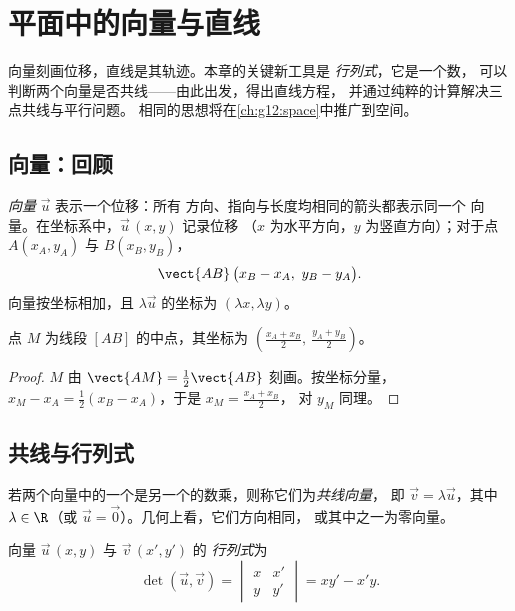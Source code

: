 \chapter{平面中的向量与直线}\label{ch:g11:vect}

向量刻画位移，直线是其轨迹。本章的关键新工具是
\emph{行列式}，它是一个数，
可以判断两个向量是否共线——由此出发，得出直线方程，
并通过纯粹的计算解决三点共线与平行问题。
相同的思想将在\cref{ch:g12:space}中推广到空间。

\section{向量：回顾}

\begin{definition}[向量，坐标]\label{def:g11:vect:vector}
\emph{向量} $\vec u$ 表示一个位移：所有
方向、指向与长度均相同的箭头都表示同一个
向量。在坐标系中，$\vec u\,(x, y)$ 记录位移
（$x$ 为水平方向，$y$ 为竖直方向）；对于点 $A(x_A, y_A)$ 与
$B(x_B, y_B)$，
\[
\vect{AB}\,\bigl(x_B - x_A,\ y_B - y_A\bigr).
\]
向量按坐标相加，且 $\lambda\vec u$ 的坐标为
$(\lambda x, \lambda y)$。
\end{definition}

\begin{proposition}[中点]\label{prop:g11:vect:midpoint}
点 $M$ 为线段 $[AB]$ 的中点，其坐标为
$\left(\frac{x_A + x_B}{2},\ \frac{y_A + y_B}{2}\right)$。
\end{proposition}

\begin{proof}
$M$ 由 $\vect{AM} = \frac12\vect{AB}$ 刻画。按坐标分量，
$x_M - x_A = \frac12(x_B - x_A)$，于是 $x_M = \frac{x_A + x_B}{2}$，
对 $y_M$ 同理。
\end{proof}

\section{共线与行列式}

\begin{definition}[共线向量]\label{def:g11:vect:collinear}
若两个向量中的一个是另一个的数乘，则称它们为\emph{共线向量}，
即 $\vec v = \lambda \vec u$，其中
$\lambda \in \R$（或 $\vec u = \vec 0$）。几何上看，它们方向相同，
或其中之一为零向量。
\end{definition}

\begin{definition}[行列式]\label{def:g11:vect:det}
向量 $\vec u\,(x, y)$ 与 $\vec v\,(x', y')$ 的
\emph{行列式}为
\[
\det(\vec u, \vec v) =
\begin{vmatrix} x & x' \\ y & y' \end{vmatrix}
= x y' - x' y .
\]
\end{definition}

